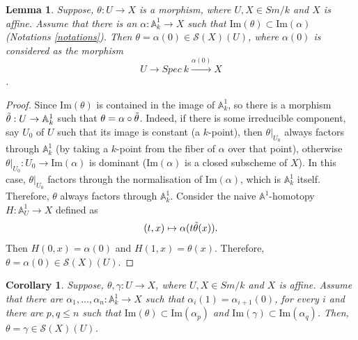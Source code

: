 \documentclass[11pt, reqno]{amsart}
\theoremstyle{plain}
\newtheorem{lemma}[thm]{Lemma}
\newtheorem{corollary}[thm]{Corollary}
\theoremstyle{definition}
\newcommand{\Spec}{{\rm Spec \,}}
\begin{document}
\begin{lemma} \label{not contained}
Suppose, $\theta: U \to X$ is a morphism, where $U, X \in Sm/k$ and $X$ is affine. Assume that there is an $\alpha: \mathbb{A}^1_k \to X$ such that 
$\mathrm{Im}(\theta) \subset \mathrm{Im}(\alpha)$ (Notations \ref{notations}). Then $\theta = \alpha(0) \in \mathcal{S}(X)(U)$, where $\alpha(0)$ is considered as the morphism
$$U \to Spec  \ k \xrightarrow{\alpha(0)} X$$.
\end{lemma}
\begin{proof}
Since $\text{Im}(\theta)$ is contained in the image of $\mathbb{A}^1_k$, so there is a morphism $\Tilde{\theta}: U \to \mathbb{A}^1_k$ such that $\theta = \alpha \circ \Tilde{\theta}$. Indeed, if there is some irreducible component, say $U_0$ of $U$ such that its image is constant (a $k$-point), then $\theta|_{U_0}$ always factors through $\mathbb{A}^1_k$ (by taking a $k$-point from the fiber of $\alpha$ over that point), otherwise $\theta|_{U_0}: U_0 \to \text{Im}(\alpha)$ is dominant ($\text{Im}(\alpha)$ is a closed subscheme of $X$). 
In this case, $\theta|_{U_0}$ factors through the normalisation of $\text{Im}(\alpha)$, which is $\mathbb{A}^1_k$ itself. Therefore, $\theta$ always factors through $\mathbb{A}^1_k$. 
Consider the naive $\mathbb{A}^1$-homotopy $H: \mathbb{A}^1_U \to X$ defined as
$$(t,x) \mapsto \alpha(t\Tilde{\theta}(x)).$$
Then $H(0, x) = \alpha(0)$ and $H(1, x) = \theta(x)$.
Therefore, $\theta = \alpha(0) \in \mathcal{S}(X)(U)$.
\end{proof}
\begin{corollary} \label{not contained corr}
Suppose, $\theta, \gamma: U \to X$,
where $U, X \in Sm/k$ and $X$ is affine. Assume that there are $\alpha_1, \dots, \alpha_n : \mathbb{A}^1_k \to X$ such that $\alpha_i(1) = \alpha_{i+1}(0)$, for every $i$ and there are $p, q \leq n$ such that $\mathrm{Im}(\theta) \subset \mathrm{Im}(\alpha_p)$ and $\mathrm{Im}(\gamma) \subset \mathrm{Im}(\alpha_q)$. Then, $\theta = \gamma \in \mathcal{S}(X)(U)$.
\end{corollary}
\end{document}

